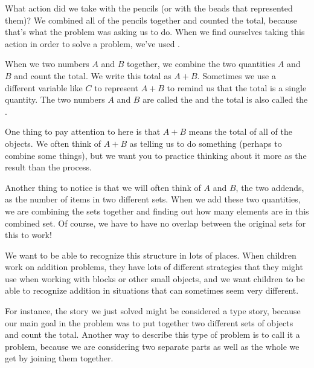 \documentclass{ximera}
\begin{document}
What action did we take with the pencils (or with the beads that represented them)? We combined all of the pencils together and counted the total, because that's what the problem was asking us to do. When we find ourselves taking this action in order to solve a problem, we've used .

\begin{definition}
When we  two numbers $A$ and $B$ together, we combine the two quantities $A$ and $B$ and count the total. We write this total as $A+B$. Sometimes we use a different variable like $C$ to represent $A+B$ to remind us that the total is a single quantity. The two numbers $A$ and $B$ are called the  and the total is also called the .
\begin{image}
\end{image}
\end{definition}

One thing to pay attention to here is that $A+B$ means the total of all of the objects. We often think of $A+B$ as telling us to do something (perhaps to combine some things), but we want you to practice thinking about it more as the result than the process.

Another thing to notice is that we will often think of $A$ and $B$, the two addends, as the number of items in two different sets. When we add these two quantities, we are combining the sets together and finding out how many elements are in this combined set. Of course, we have to have no overlap between the original sets for this to work!

We want to be able to recognize this structure in lots of places. When children work on addition problems, they have lots of different strategies that they might use when working with blocks or other small objects, and we want children to be able to recognize addition in situations that can sometimes seem very different. 

For instance, the story we just solved might be considered a  type story, because our main goal in the problem was to put together two different sets of objects and count the total. Another way to describe this type of problem is to call it a  problem, because we are considering two separate parts as well as the whole we get by joining them together. 
\end{document}
